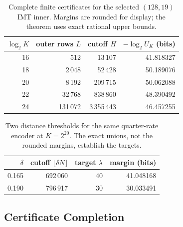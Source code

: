 \begin{table}[!htbp]
\centering
\caption{Complete finite certificates for the selected $(128,19)$ IMT inner.
Margins are rounded for display; the theorem uses exact rational upper bounds.}
\label{tab:finite-bch-margins}
\begin{tabular}{@{}rrrr@{}}
\toprule
$\log_2K$ & outer rows $L$ & cutoff $H$ & $-\log_2U_K$ (bits) \\
\midrule
16 & 512 & 13\,107 & 41.818327 \\
18 & 2\,048 & 52\,428 & 50.189076 \\
20 & 8\,192 & 209\,715 & 50.062088 \\
22 & 32\,768 & 838\,860 & 48.390492 \\
24 & 131\,072 & 3\,355\,443 & 46.457255 \\
\bottomrule
\end{tabular}
\end{table}

\begin{table}[!htbp]
\centering
\caption{Two distance thresholds for the same quarter-rate encoder at
$K=2^{20}$. The exact unions, not the rounded margins, establish the targets.}
\label{tab:finite-quarter-margins}
\begin{tabular}{@{}rrrr@{}}
\toprule
$\delta$ & cutoff $\lfloor\delta N\rfloor$ & target $\lambda$ & margin (bits) \\
\midrule
0.165 & 692\,060 & 40 & 41.048168 \\
0.190 & 796\,917 & 30 & 30.033491 \\
\bottomrule
\end{tabular}
\end{table}
\FloatBarrier

\subsection{Certificate Completion}

